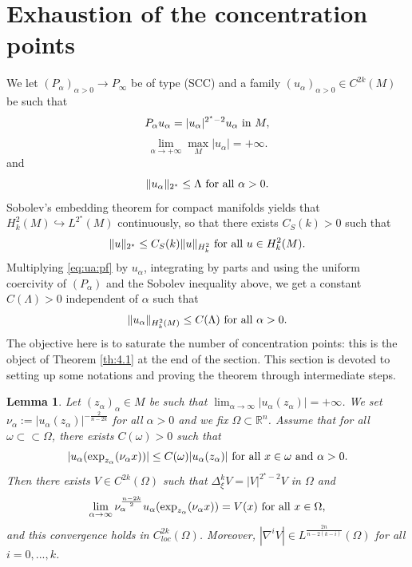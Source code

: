 \documentclass[reqno]{amsart}
\newtheorem{lemma}{Lemma}[section]
\def \rn {\mathbb{R}^n}
\def \crit {2^\star}
\def \ua {u_\alpha}
\def \na {\nu_\alpha}
\def \za {z_\alpha}
\begin{document}
\section{Exhaustion of the concentration points}
We let $(P_\alpha)_{\alpha>0}\to P_\infty$ be of type (SCC) and a family $(\ua)_{\alpha>0}\in C^{2k}(M)$ be such that
\begin{equation}\label{eq:ua:pf}
P_\alpha u_\alpha=|u_\alpha|^{\crit-2}u_\alpha\hbox{ in }M,
\end{equation}
\begin{equation}\label{hyp:unbnd}
\lim_{\alpha\to +\infty}\max_M|\ua|=+\infty.
\end{equation}
and \begin{equation}\label{hyp:bnd:nrj:pf}
\Vert\ua\Vert_{\crit} \leq \Lambda \hbox{ for all }\alpha>0.
\end{equation} 
Sobolev's embedding theorem for compact manifolds yields that $H_k^2(M)\hookrightarrow L^{\crit}(M)$ continuously, so that there exists $C_S(k)>0$ such that 
\begin{equation}\label{sobo:ineq:M}
\Vert u\Vert_{\crit}\leq C_S(k)\Vert u\Vert_{H_k^2}\hbox{ for all }u\in H_k^2(M).
\end{equation}
Multiplying \eqref{eq:ua:pf} by $\ua$, integrating by parts and using the uniform coercivity of $(P_\alpha)$ and the Sobolev inequality above, we get a constant $C(\Lambda)>0$ independent of $\alpha$  such that
\begin{equation}\label{hyp:bnd:nrj:pf:bis}
\Vert \ua\Vert_{H_k^2(M)}\leq C(\Lambda)\hbox{ for all }\alpha>0.
\end{equation}
The objective here is to saturate the number of concentration points: this is the object of Theorem \ref{th:4.1} at the end of the section. This section is devoted to setting up some notations and proving the theorem through intermediate steps. 
\begin{lemma}\label{lem:1} Let $(\za)_\alpha\in M$ be such that $\lim_{\alpha\to \infty}|\ua(\za)|=+\infty$. We set $\na:=|\ua(\za)|^{-\frac{2}{n-2k}}$ for all $\alpha>0$ and we fix $\Omega\subset\rn$. Assume that for all $\omega\subset\subset \Omega$, there exists $C(\omega)>0$ such that
\begin{equation}\label{assump:01}
|\ua(\hbox{exp}_{\za}(\na x))|\leq C(\omega)|\ua(\za)|\hbox{ for all }x\in\omega\hbox{ and }\alpha>0.
\end{equation}
Then there exists $V\in C^{2k}(\Omega)$ such that $\Delta_\xi^k V=|V|^{\crit-2}V$ in $\Omega$ and
\begin{equation*}
\lim_{\alpha\to \infty}\na^{\frac{n-2k}{2}}\ua(\hbox{exp}_{\za}(\na x))=V(x)\hbox{ for all }x\in \Omega,
\end{equation*}
and this convergence holds in $C^{2k}_{loc}(\Omega)$. Moreover, $|\nabla^iV|\in L^{\frac{2n}{n-2(k-i)}}(\Omega)$ for all $i=0,...,k$.
\end{lemma}
\end{document}
